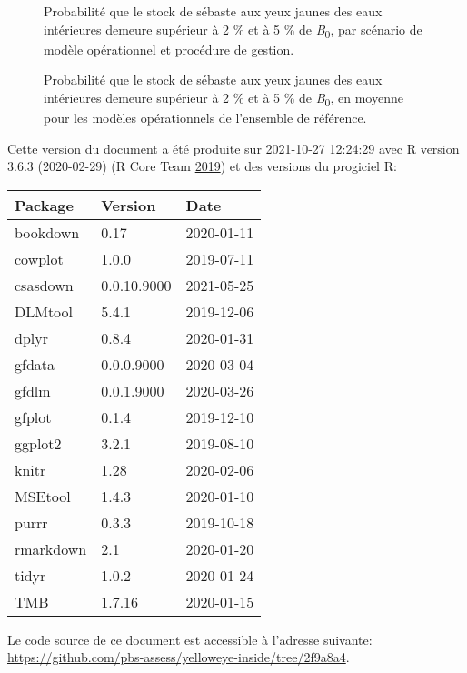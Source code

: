 \documentclass[11pt]{book}
\begin{document}
\begin{figure}[htb]

{\centering {} 

}

\caption{Probabilité que le stock de sébaste aux yeux jaunes des eaux intérieures demeure supérieur à 2 \% et à 5 \% de \emph{B}\textsubscript{0}, par scénario de modèle opérationnel et procédure de gestion.}\label{fig:cosewic-all}
\end{figure}
\clearpage


\begin{figure}[htb]

{\centering {} 

}

\caption{Probabilité que le stock de sébaste aux yeux jaunes des eaux intérieures demeure supérieur à 2 \% et à 5 \% de \emph{B}\textsubscript{0}, en moyenne pour les modèles opérationnels de l'ensemble de référence.}\label{fig:cosewic-avg}
\end{figure}
\clearpage


\clearpage

\hypertarget{environnement-informatique}{%
\label{environnement-informatique}}

Cette version du document a été produite sur 2021-10-27 12:24:29 avec R version 3.6.3 (2020-02-29) (R Core Team \protect\hyperlink{ref-r2019}{2019}) et des versions du progiciel R:
\begin{longtable}[]{@{}lll@{}}
\toprule
Package & Version & Date\tabularnewline
\midrule
\endhead
bookdown & 0.17 & 2020-01-11\tabularnewline
cowplot & 1.0.0 & 2019-07-11\tabularnewline
csasdown & 0.0.10.9000 & 2021-05-25\tabularnewline
DLMtool & 5.4.1 & 2019-12-06\tabularnewline
dplyr & 0.8.4 & 2020-01-31\tabularnewline
gfdata & 0.0.0.9000 & 2020-03-04\tabularnewline
gfdlm & 0.0.1.9000 & 2020-03-26\tabularnewline
gfplot & 0.1.4 & 2019-12-10\tabularnewline
ggplot2 & 3.2.1 & 2019-08-10\tabularnewline
knitr & 1.28 & 2020-02-06\tabularnewline
MSEtool & 1.4.3 & 2020-01-10\tabularnewline
purrr & 0.3.3 & 2019-10-18\tabularnewline
rmarkdown & 2.1 & 2020-01-20\tabularnewline
tidyr & 1.0.2 & 2020-01-24\tabularnewline
TMB & 1.7.16 & 2020-01-15\tabularnewline
\bottomrule
\end{longtable}
Le code source de ce document est accessible à l'adresse suivante:\\
\url{https://github.com/pbs-assess/yelloweye-inside/tree/2f9a8a4}.
\end{document}
